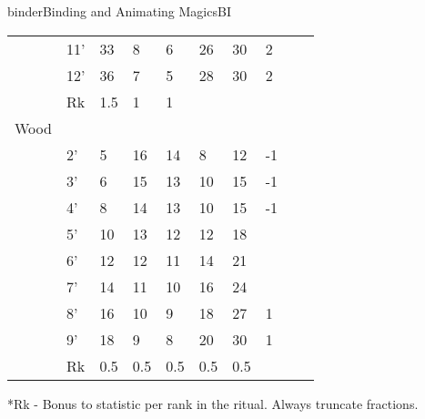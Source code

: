 \begin{college}[1.1]{binder}{Binding and Animating Magics}{BI}
\begin{table*}[h]
\begin{tabular}{llllllllll}
 & 11' & 33 & 8 & 6 & 26 & 30 & 2 \\
 & 12' & 36 & 7 & 5 & 28 & 30 & 2 \\
 & Rk & 1.5 & 1 & 1 \\
 \hline
Wood \\  \hline
 & 2' & 5 & 16 & 14 & 8 & 12 & -1 \\
 & 3' & 6 & 15 & 13 & 10 & 15 & -1 \\
 & 4' & 8 & 14 & 13 & 10 & 15 & -1 \\
 & 5' & 10 & 13 & 12 & 12 & 18 \\
 & 6' & 12 & 12 & 11 & 14 & 21 \\
 & 7' & 14 & 11 & 10 & 16 & 24 \\
 & 8' & 16 & 10 & 9 & 18 & 27 & 1 \\
 & 9' & 18 & 9 & 8 & 20 & 30 & 1 \\
 & Rk & 0.5 & 0.5 & 0.5 & 0.5 & 0.5 \\
\end{tabular}

*Rk - Bonus to statistic per rank in the ritual. Always truncate fractions.
\end{table*}
\end{college}
